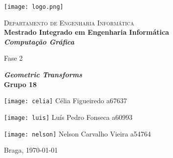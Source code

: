 \begin{titlepage}


\begin{minipage}{0.3\textwidth}
\begin{flushleft} 
\texttt{[image: logo.png]}
\end{flushleft}
\end{minipage}
\begin{minipage}{0.6\textwidth}
\begin{flushright} 

\textsc{Departamento de Engenharia Informática}\\[0.1cm]
\bfseries Mestrado Integrado em Engenharia Informática \\ [0.1cm]
\bfseries \textit{Computação Gráfica}\\[8mm]

\end{flushright}
\end{minipage}


\vspace{3cm}


\begin{center}


\LARGE Fase 2

\Large \textbf{\textit{Geometric Transforms}}\\[1.5cm]


{\Large \bfseries Grupo 18\\[2cm] }


\noindent\begin{minipage}[b]{.2\textwidth}
	\texttt{[image: celia]}
	\small{Célia Figueiredo a67637}
\end{minipage} 
\hfill
\begin{minipage}[b]{.2\textwidth}
	\texttt{[image: luis]}
	\small{Luís Pedro Fonseca a60993}
\end{minipage}
\hfill
\begin{minipage}[b]{.2\textwidth}
	\texttt{[image: nelson]}
	\small{Nelson Carvalho Vieira a54764}
\end{minipage}




\vspace{3ex}


\vfill

\large Braga, {\large \today}

\end{center}
\end{titlepage}
